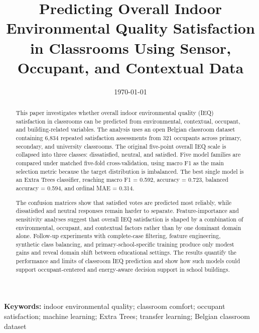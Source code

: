 ﻿\documentclass[11pt]{article}
\title{Predicting Overall Indoor Environmental Quality Satisfaction in Classrooms Using Sensor, Occupant, and Contextual Data}
\author{}
\date{\today}
\newcommand{\AIon}{\color{blue!65!black}}
\begin{document}
\AIon

\maketitle
\begin{abstract}
This paper investigates whether overall indoor environmental quality (IEQ) satisfaction in classrooms can be predicted from environmental, contextual, occupant, and building-related variables. The analysis uses an open Belgian classroom dataset containing 6{,}834 repeated satisfaction assessments from 321 occupants across primary, secondary, and university classrooms. The original five-point overall IEQ scale is collapsed into three classes: dissatisfied, neutral, and satisfied. Five model families are compared under matched five-fold cross-validation, using macro F1 as the main selection metric because the target distribution is imbalanced. The best single model is an Extra Trees classifier, reaching macro F1 = 0.592, accuracy = 0.723, balanced accuracy = 0.594, and ordinal MAE = 0.314.

The confusion matrices show that satisfied votes are predicted most reliably, while dissatisfied and neutral responses remain harder to separate. Feature-importance and sensitivity analyses suggest that overall IEQ satisfaction is shaped by a combination of environmental, occupant, and contextual factors rather than by one dominant domain alone. Follow-up experiments with complete-case filtering, feature engineering, synthetic class balancing, and primary-school-specific training produce only modest gains and reveal domain shift between educational settings. The results quantify the performance and limits of classroom IEQ prediction and show how such models could support occupant-centered and energy-aware decision support in school buildings.
\end{abstract}
\noindent\textbf{Keywords:} indoor environmental quality; classroom comfort; occupant satisfaction; machine learning; Extra Trees; transfer learning; Belgian classroom dataset \vspace{0.2\baselineskip}
\end{document}
